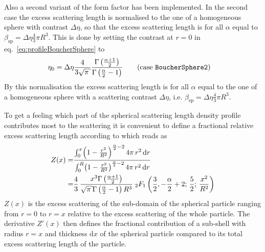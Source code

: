  Also a second variant of the form factor has been implemented. In the second case the excess scattering length is normalised to the one of a homogeneous sphere with contrast $\Delta\eta$, so that the excess scattering length is for all $\alpha$ equal to $\beta_\mathrm{sp}=\Delta\eta \frac{4}{3}\pi R^3$. This is done by setting the contrast at $r=0$ in eq.\ \ref{eq:profileBoucherSphere} to
\begin{align}
\eta_0&=\Delta\eta \frac{4}{3\sqrt{\pi}} \frac{\Gamma\left(\frac{\alpha+1}{2}\right)}{\Gamma\left(\frac{\alpha}{2}-1\right)}  \qquad \mbox{(case \texttt{BoucherSphere2})}
\label{eq:eta0BoucherSphere2}
\end{align}
By this normalisation the excess scattering length is for all $\alpha$ equal to the one of a homogeneous sphere with a scattering contrast $\Delta\eta$, i.e. $\beta_\mathrm{sp}=\Delta\eta \frac{4}{3}\pi R^3$.

To get a feeling which part of the spherical scattering length density profile contributes most to the scattering it is convenient to define a fractional relative excess scattering length according to \cite{Boucher1983} which reads as
\begin{align}
Z(x) = & \frac{
            \int_{0}^{x}\! \left( 1-{\frac {{r}^{2}}{{R}^{2}}} \right) ^{\frac{\alpha}{2}-2} 4\pi\,{r}^{2}\,{\rm d}r
           }{
            \int_{0}^{R}\! \left( 1-{\frac {{r}^{2}}{{R}^{2}}} \right) ^{\frac{\alpha}{2}-2} 4\pi\,{r}^{2}\,{\rm d}r
           } \nonumber \\
  = & \frac{4}{3} \,{\frac {{x}^{3}\Gamma  \left(\frac{\alpha+1}{2} \right) }{\sqrt {\pi }
\Gamma  \left( \frac{\alpha}{2}-1 \right) {R}^{3}}
\;_2F_1\left(\frac{3}{2},-\frac{\alpha}{2}+2;\,\frac{5}{2};\,{\frac {{x}^{2}}{{R}^{2}}}\right)}
\end{align}
$Z(x)$ is the excess scattering of the sub-domain of the spherical particle ranging from $r=0$ to $r=x$ relative to the excess scattering of the whole particle. The derivative $Z'(x)$ then defines the fractional contribution of a sub-shell with radius $r=x$ and thickness $\textrm{d}x$  of the spherical particle compared to its total excess scattering length of the particle.

